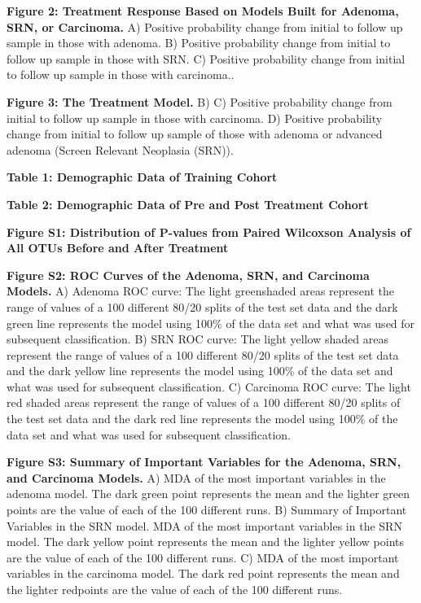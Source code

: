 \documentclass[12pt,]{article}
\begin{document}
\textbf{Figure 2: Treatment Response Based on Models Built for Adenoma,
SRN, or Carcinoma.} A) Positive probability change from initial to
follow up sample in those with adenoma. B) Positive probability change
from initial to follow up sample in those with SRN. C) Positive
probability change from initial to follow up sample in those with
carcinoma..

\textbf{Figure 3: The Treatment Model.} B) C) Positive probability
change from initial to follow up sample in those with carcinoma. D)
Positive probability change from initial to follow up sample of those
with adenoma or advanced adenoma (Screen Relevant Neoplasia (SRN)).

\newpage

\textbf{Table 1: Demographic Data of Training Cohort}

\textbf{Table 2: Demographic Data of Pre and Post Treatment Cohort}

\newpage

\textbf{Figure S1: Distribution of P-values from Paired Wilcoxson
Analysis of All OTUs Before and After Treatment}

\textbf{Figure S2: ROC Curves of the Adenoma, SRN, and Carcinoma
Models.} A) Adenoma ROC curve: The light greenshaded areas represent the
range of values of a 100 different 80/20 splits of the test set data and
the dark green line represents the model using 100\% of the data set and
what was used for subsequent classification. B) SRN ROC curve: The light
yellow shaded areas represent the range of values of a 100 different
80/20 splits of the test set data and the dark yellow line represents
the model using 100\% of the data set and what was used for subsequent
classification. C) Carcinoma ROC curve: The light red shaded areas
represent the range of values of a 100 different 80/20 splits of the
test set data and the dark red line represents the model using 100\% of
the data set and what was used for subsequent classification.

\textbf{Figure S3: Summary of Important Variables for the Adenoma, SRN,
and Carcinoma Models.} A) MDA of the most important variables in the
adenoma model. The dark green point represents the mean and the lighter
green points are the value of each of the 100 different runs. B) Summary
of Important Variables in the SRN model. MDA of the most important
variables in the SRN model. The dark yellow point represents the mean
and the lighter yellow points are the value of each of the 100 different
runs. C) MDA of the most important variables in the carcinoma model. The
dark red point represents the mean and the lighter redpoints are the
value of each of the 100 different runs.
\end{document}
